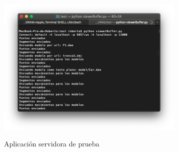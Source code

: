 \begin{figure}[H]
  \begin{center}
    \includegraphics[width=0.8\textwidth]{figures/servertest3dviz.png}
		\label{fig.servertest3dviz}
		\caption{Aplicación servidora de prueba}
		\end{center}
\end{figure}














